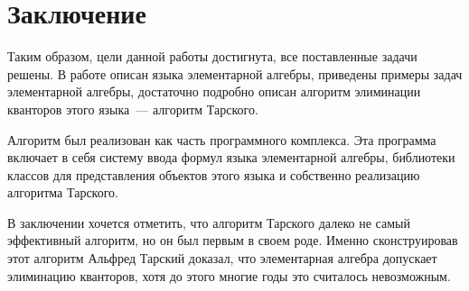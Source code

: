\section*{Заключение}

Таким образом, цели данной работы достигнута, все поставленные задачи решены. В работе описан языка элементарной алгебры, приведены примеры задач элементарной алгебры, достаточно подробно описан алгоритм элиминации кванторов этого языка~--- алгоритм Тарского. 

Алгоритм был реализован как часть программного комплекса. Эта программа включает в себя систему ввода формул языка элементарной алгебры, библиотеки классов для представления объектов этого языка и собственно реализацию алгоритма Тарского.

В заключении хочется отметить, что алгоритм Тарского далеко не самый эффективный алгоритм, но он был первым в своем роде. Именно сконструировав этот алгоритм Альфред Тарский доказал, что элементарная алгебра допускает элиминацию кванторов, хотя до этого многие годы это считалось невозможным. 